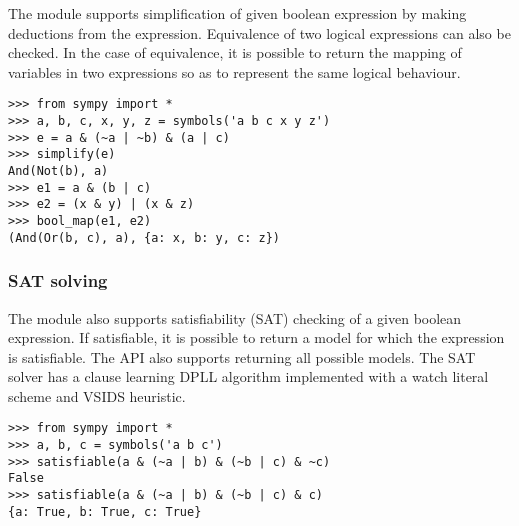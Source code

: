 The module supports simplification of given boolean expression by making
deductions from the expression. Equivalence of two logical expressions can also
be checked. In the case of equivalence, it is possible to return the mapping of
variables in two expressions so as to represent the same logical behaviour.

\begin{verbatim}
>>> from sympy import *
>>> a, b, c, x, y, z = symbols('a b c x y z')
>>> e = a & (~a | ~b) & (a | c)
>>> simplify(e)
And(Not(b), a)
>>> e1 = a & (b | c)
>>> e2 = (x & y) | (x & z)
>>> bool_map(e1, e2)
(And(Or(b, c), a), {a: x, b: y, c: z})
\end{verbatim}

\subsubsection{SAT solving}

The module also supports satisfiability (SAT) checking of a given boolean
expression. If satisfiable, it is possible to return a model for which the
expression is satisfiable. The API also supports returning all possible models.
The SAT solver has a clause learning DPLL algorithm implemented with a watch
literal scheme and VSIDS heuristic\cite{moskewicz2008method}.

\begin{verbatim}
>>> from sympy import *
>>> a, b, c = symbols('a b c')
>>> satisfiable(a & (~a | b) & (~b | c) & ~c)
False
>>> satisfiable(a & (~a | b) & (~b | c) & c)
{a: True, b: True, c: True}
\end{verbatim}
